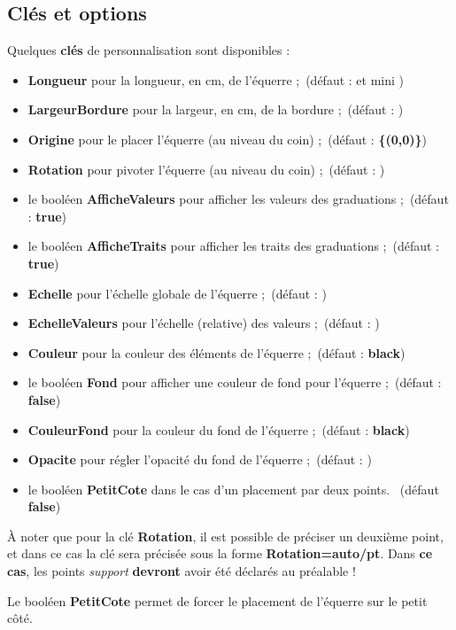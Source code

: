 \documentclass[french,a4paper,11pt]{article}
\newcommand\Cle[1]{{\bfseries\sffamily\textlangle #1\textrangle}}
\begin{document}
\subsection{Clés et options}

\begin{tipblock}
Quelques \Cle{clés} de personnalisation sont disponibles :

\begin{itemize}
	\item \Cle{Longueur} pour la longueur, en cm, de l'équerre ;\hfill~(défaut : \Cle{10} et mini \Cle{4.5})
	\item \Cle{LargeurBordure} pour la largeur, en cm, de la bordure ;\hfill~(défaut : \Cle{1})
	\item \Cle{Origine} pour le placer l'équerre (au niveau du coin) ;\hfill~(défaut : \Cle{\{(0,0)\}})
	\item \Cle{Rotation} pour pivoter l'équerre (au niveau du coin) ;\hfill~(défaut : \Cle{0})
	\item le booléen \Cle{AfficheValeurs} pour afficher les valeurs des graduations ;\hfill~(défaut : \Cle{true})
	\item le booléen \Cle{AfficheTraits} pour afficher les traits des graduations ;\hfill~(défaut : \Cle{true})
	\item \Cle{Echelle} pour l'échelle globale de l'équerre ;\hfill~(défaut : \Cle{1})
	\item \Cle{EchelleValeurs} pour l'échelle (relative) des valeurs ;\hfill~(défaut : \Cle{0.8})
	\item \Cle{Couleur} pour la couleur des éléments de l'équerre ;\hfill~(défaut : \Cle{black})
	\item le booléen \Cle{Fond} pour afficher une couleur de fond pour l'équerre ;\hfill~(défaut : \Cle{false})
	\item \Cle{CouleurFond} pour la couleur du fond de l'équerre ;\hfill~(défaut : \Cle{black})
	\item \Cle{Opacite} pour régler l'opacité du fond de l'équerre ;\hfill~(défaut : \Cle{0.5})
	\item le booléen \Cle{PetitCote} dans le cas d'un placement par deux points. \hfill~(défaut \Cle{false})
\end{itemize}

À noter que pour la clé \Cle{Rotation}, il est possible de préciser un deuxième point, et dans ce cas la clé sera précisée sous la forme \Cle{Rotation=auto/pt}. Dans \textbf{ce cas}, les points \textit{support} \textbf{devront} avoir été déclarés au préalable !

Le booléen \Cle{PetitCote} permet de forcer le placement de l'équerre sur le petit côté.
\end{tipblock}
\end{document}
